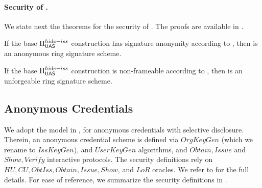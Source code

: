 
\paragraph{Security of \CUASRing.} %
We state next the theorems for the security of \CUASRing. The proofs are
available in .

\begin{theorem}
  If the base $\Pi_{\mathsf{UAS}}^{hide-iss}$ construction has signature anonymity
  according to , then \CUASRing is an anonymous
  ring signature scheme.
\end{theorem}

\begin{theorem}
  If the base $\Pi_{\mathsf{UAS}}^{hide-iss}$ construction is non-frameable according to
  , then \CUASRing is an unforgeable ring signature
  scheme.
\end{theorem}

\subsection{Anonymous Credentials}
\label{ssec:related-models-ac}

We adopt the model in \cite{fhs19}, for anonymous credentials with selective
disclosure. Therein, an anonymous credential scheme is defined via $OrgKeyGen$
(which we rename to $IssKeyGen$), and $UserKeyGen$ algorithms, and $Obtain,
Issue$ and $Show,Verify$ interactive protocols. The security definitions rely on
$HU, CU, ObtIss, Obtain, Issue, Show$, and $LoR$ oracles. We refer to
\cite{fhs19} for the full details. For ease of reference, we summarize the
security definitions in .%

